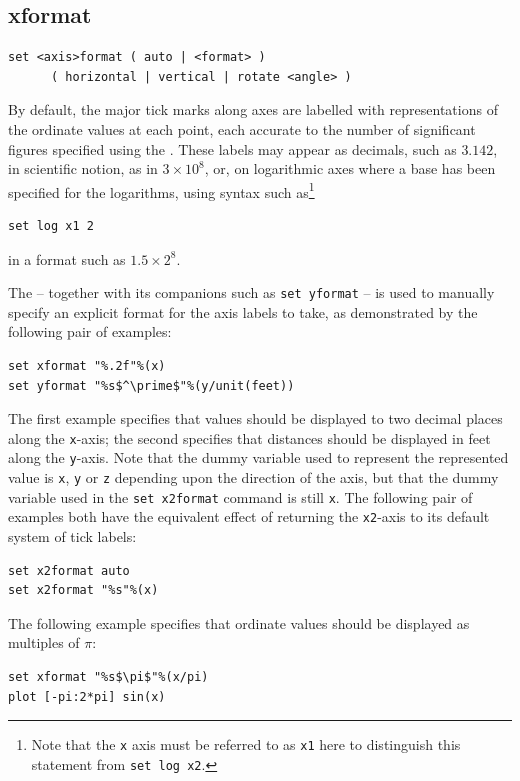 \subsection{xformat}

\begin{verbatim}
set <axis>format ( auto | <format> )
      ( horizontal | vertical | rotate <angle> )
\end{verbatim}

By default, the major tick marks along axes are labelled with representations
of the ordinate values at each point, each accurate to the number of
significant figures specified using the . These
labels may appear as decimals, such as $3.142$, in scientific notion, as in
$3\times10^8$, or, on logarithmic axes where a base has been specified for the
logarithms, using syntax such as\footnote{Note that the {\tt x} axis must be
referred to as {\tt x1} here to distinguish this statement from {\tt set log
x2}.}
\begin{verbatim}
set log x1 2
\end{verbatim}
in a format such as $1.5\times2^8$.

The  -- together with its companions such as {\tt set
yformat} -- is used to manually specify an explicit format for the axis labels
to take, as demonstrated by the following pair of examples:
\begin{verbatim}
set xformat "%.2f"%(x)
set yformat "%s$^\prime$"%(y/unit(feet))
\end{verbatim}
The first example specifies that values should be displayed to two
decimal places along the {\tt x}-axis; the second specifies that distances should
be displayed in feet along the {\tt y}-axis. Note that the dummy variable used to
represent the represented value is {\tt x}, {\tt y} or {\tt z} depending upon the
direction of the axis, but that the dummy variable used in the {\tt set
x2format} command is still {\tt x}. The following pair of examples both have
the equivalent effect of returning the {\tt x2}-axis to its default system of
tick labels:
\begin{verbatim}
set x2format auto
set x2format "%s"%(x)
\end{verbatim}

The following example specifies that ordinate values should be displayed as
multiples of $\pi$:
\begin{verbatim}
set xformat "%s$\pi$"%(x/pi)
plot [-pi:2*pi] sin(x)
\end{verbatim}

